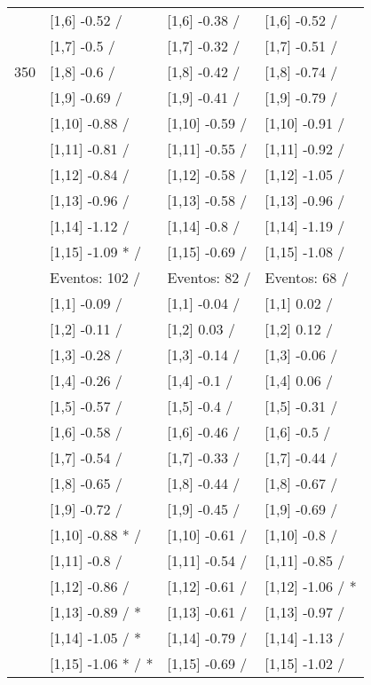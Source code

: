 \begin{table}
\begin{tabular}[t]{llll}
 & {}[1,6] -0.52  / & {}[1,6] -0.38  / & {}[1,6] -0.52  /\\
 & {}[1,7] -0.5  / & {}[1,7] -0.32  / & {}[1,7] -0.51  /\\
350 & {}[1,8] -0.6  / & {}[1,8] -0.42  / & {}[1,8] -0.74  /\\
\addlinespace
 & {}[1,9] -0.69  / & {}[1,9] -0.41  / & {}[1,9] -0.79  /\\
 & {}[1,10] -0.88  / & {}[1,10] -0.59  / & {}[1,10] -0.91  /\\
 & {}[1,11] -0.81  / & {}[1,11] -0.55  / & {}[1,11] -0.92  /\\
 & {}[1,12] -0.84  / & {}[1,12] -0.58  / & {}[1,12] -1.05  /\\
 & {}[1,13] -0.96  / & {}[1,13] -0.58  / & {}[1,13] -0.96  /\\
\addlinespace
 & {}[1,14] -1.12  / & {}[1,14] -0.8  / & {}[1,14] -1.19  /\\
 & {}[1,15] -1.09 * / & {}[1,15] -0.69  / & {}[1,15] -1.08  /\\
 & Eventos:  102 / & Eventos:  82 / & Eventos:  68 /\\
 & {}[1,1] -0.09  / & {}[1,1] -0.04  / & {}[1,1] 0.02  /\\
 & {}[1,2] -0.11  / & {}[1,2] 0.03  / & {}[1,2] 0.12  /\\
\addlinespace
 & {}[1,3] -0.28  / & {}[1,3] -0.14  / & {}[1,3] -0.06  /\\
 & {}[1,4] -0.26  / & {}[1,4] -0.1  / & {}[1,4] 0.06  /\\
 & {}[1,5] -0.57  / & {}[1,5] -0.4  / & {}[1,5] -0.31  /\\
 & {}[1,6] -0.58  / & {}[1,6] -0.46  / & {}[1,6] -0.5  /\\
 & {}[1,7] -0.54  / & {}[1,7] -0.33  / & {}[1,7] -0.44  /\\
\addlinespace
500 & {}[1,8] -0.65  / & {}[1,8] -0.44  / & {}[1,8] -0.67  /\\
 & {}[1,9] -0.72  / & {}[1,9] -0.45  / & {}[1,9] -0.69  /\\
 & {}[1,10] -0.88 * / & {}[1,10] -0.61  / & {}[1,10] -0.8  /\\
 & {}[1,11] -0.8  / & {}[1,11] -0.54  / & {}[1,11] -0.85  /\\
 & {}[1,12] -0.86  / & {}[1,12] -0.61  / & {}[1,12] -1.06  / *\\
\addlinespace
 & {}[1,13] -0.89  / * & {}[1,13] -0.61  / & {}[1,13] -0.97  /\\
 & {}[1,14] -1.05  / * & {}[1,14] -0.79  / & {}[1,14] -1.13  /\\
 & {}[1,15] -1.06 * / * & {}[1,15] -0.69  / & {}[1,15] -1.02  /\\
\bottomrule
\end{tabular}
\end{table}

